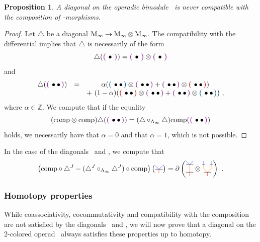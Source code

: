 \documentclass[twoside, 12pt]{amsart}
\newtheorem{proposition}[definition]{Proposition}
\theoremstyle{remark}
\begin{document}
\begin{proposition} 
  \label{thm:nofunctorial}
  A diagonal on the operadic bimodule \Minf\ is never compatible with the composition of \Ainf -morphisms.  
\end{proposition}

\begin{proof} 
  Let $\triangle$ be a diagonal $\mathrm{M}_\infty \rightarrow \mathrm{M}_\infty \otimes \mathrm{M}_\infty$.
  The compatibility with the differential implies that $\triangle$ is necessarily of the form
  \[
      \triangle(\purple{\bullet }) = \purple{\bullet } \otimes \purple{\bullet } \]
and
\[ \begin{matrix}
      \triangle (\purple{\bullet \bullet }) &= &\alpha (\blue{\bullet \bullet }\otimes \purple{\bullet \bullet } + \purple{\bullet \bullet }\otimes\red{\bullet \bullet }) \\ & &+ \ (1-\alpha)(\red{\bullet \bullet }\otimes \purple{\bullet \bullet }+\purple{\bullet \bullet}\otimes \blue{\bullet \bullet}) \ ,
  \end{matrix} \]
  where $\alpha \in \mathbb{Z}$.
  We compute that if the equality
  \[ ( \comp \otimes \comp ) \triangle ( \purple{\bullet \bullet} ) = (\triangle \circ_{\Ainf} \triangle ) \comp  ( \purple{\bullet \bullet} ) \]
  holds, we necessarily have that $\alpha = 0$ and that $\alpha =1$, which is not possible.
\end{proof}

\noindent In the case of the diagonals \diagainf\ and \diagminf , we compute that 
  \[ \left( \comp  \circ \diagminf - (\diagminf \circ_{\Ainf} \diagminf ) \circ \comp \right) \left( \arbreopdeuxmorph  \right) = \partial \left( \arbreopcompun \otimes \arbreopcompdeux \right)  \ . \]

\subsubsection{Homotopy properties}

While coassociativity, cocommutativity and compatibility with the composition are not satisfied by the diagonals \diagainf\ and \diagminf , we will now prove that a diagonal on the 2-colored operad \Ainfdeux\ always satisfies these properties up to homotopy.
\end{document}

